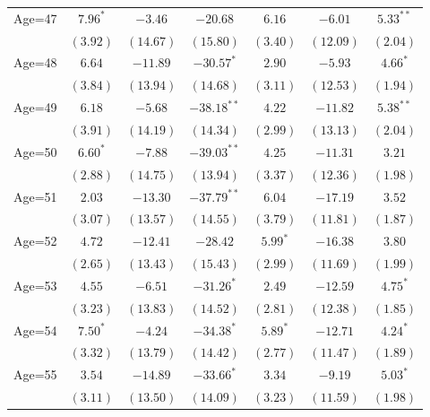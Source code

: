 \documentclass[fullpage]{paper}
\begin{document}
\begin{center}
\begin{longtable}{l c c c c c c }
Age=47      & $7.96^{*}$    & $-3.46$       & $-20.68$      & $6.16$        & $-6.01$       & $5.33^{**}$   \\
            & $(3.92)$      & $(14.67)$     & $(15.80)$     & $(3.40)$      & $(12.09)$     & $(2.04)$      \\
Age=48      & $6.64$        & $-11.89$      & $-30.57^{*}$  & $2.90$        & $-5.93$       & $4.66^{*}$    \\
            & $(3.84)$      & $(13.94)$     & $(14.68)$     & $(3.11)$      & $(12.53)$     & $(1.94)$      \\
Age=49      & $6.18$        & $-5.68$       & $-38.18^{**}$ & $4.22$        & $-11.82$      & $5.38^{**}$   \\
            & $(3.91)$      & $(14.19)$     & $(14.34)$     & $(2.99)$      & $(13.13)$     & $(2.04)$      \\
Age=50      & $6.60^{*}$    & $-7.88$       & $-39.03^{**}$ & $4.25$        & $-11.31$      & $3.21$        \\
            & $(2.88)$      & $(14.75)$     & $(13.94)$     & $(3.37)$      & $(12.36)$     & $(1.98)$      \\
Age=51      & $2.03$        & $-13.30$      & $-37.79^{**}$ & $6.04$        & $-17.19$      & $3.52$        \\
            & $(3.07)$      & $(13.57)$     & $(14.55)$     & $(3.79)$      & $(11.81)$     & $(1.87)$      \\
Age=52      & $4.72$        & $-12.41$      & $-28.42$      & $5.99^{*}$    & $-16.38$      & $3.80$        \\
            & $(2.65)$      & $(13.43)$     & $(15.43)$     & $(2.99)$      & $(11.69)$     & $(1.99)$      \\
Age=53      & $4.55$        & $-6.51$       & $-31.26^{*}$  & $2.49$        & $-12.59$      & $4.75^{*}$    \\
            & $(3.23)$      & $(13.83)$     & $(14.52)$     & $(2.81)$      & $(12.38)$     & $(1.85)$      \\
Age=54      & $7.50^{*}$    & $-4.24$       & $-34.38^{*}$  & $5.89^{*}$    & $-12.71$      & $4.24^{*}$    \\
            & $(3.32)$      & $(13.79)$     & $(14.42)$     & $(2.77)$      & $(11.47)$     & $(1.89)$      \\
Age=55      & $3.54$        & $-14.89$      & $-33.66^{*}$  & $3.34$        & $-9.19$       & $5.03^{*}$    \\
            & $(3.11)$      & $(13.50)$     & $(14.09)$     & $(3.23)$      & $(11.59)$     & $(1.98)$      \\

\end{longtable}
\end{center}
\end{document}
